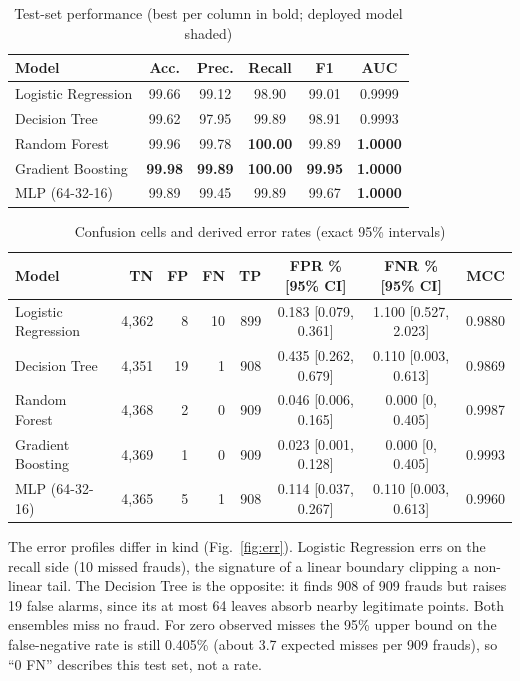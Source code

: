 \documentclass[conference]{IEEEtran}
\newcommand{\tabfont}{\footnotesize}
\begin{document}
\begin{table}[!t]
\caption{Test-set performance (best per column in bold; deployed model shaded)}\label{tab:bench}
\centering\tabfont
\setlength{\tabcolsep}{3.5pt}
\begin{tabular}{@{}lccccc@{}}
\toprule
\textbf{Model} & \textbf{Acc.} & \textbf{Prec.} & \textbf{Recall} & \textbf{F1} & \textbf{AUC}\\
\midrule
Logistic Regression & 99.66 & 99.12 & 98.90 & 99.01 & 0.9999\\
Decision Tree & 99.62 & 97.95 & 99.89 & 98.91 & 0.9993\\
\rowcolor{navy!8}Random Forest & 99.96 & 99.78 & \textbf{100.00} & 99.89 & \textbf{1.0000}\\
Gradient Boosting & \textbf{99.98} & \textbf{99.89} & \textbf{100.00} & \textbf{99.95} & \textbf{1.0000}\\
MLP (64-32-16) & 99.89 & 99.45 & 99.89 & 99.67 & \textbf{1.0000}\\
\bottomrule
\end{tabular}
\par{}
\end{table}

\begin{table}[!t]
\caption{Confusion cells and derived error rates (exact 95\% intervals)}\label{tab:cm}
\centering\tabfont
\begin{tabular}{@{}lrrrrccc@{}}
\toprule
\textbf{Model} & \textbf{TN} & \textbf{FP} & \textbf{FN} & \textbf{TP} & \textbf{FPR \% [95\% CI]} & \textbf{FNR \% [95\% CI]} & \textbf{MCC}\\
\midrule
Logistic Regression & 4,362 & 8 & 10 & 899 & 0.183 [0.079, 0.361] & 1.100 [0.527, 2.023] & 0.9880\\
Decision Tree & 4,351 & 19 & 1 & 908 & 0.435 [0.262, 0.679] & 0.110 [0.003, 0.613] & 0.9869\\
\rowcolor{navy!8}Random Forest & 4,368 & 2 & 0 & 909 & 0.046 [0.006, 0.165] & 0.000 [0, 0.405] & 0.9987\\
Gradient Boosting & 4,369 & 1 & 0 & 909 & 0.023 [0.001, 0.128] & 0.000 [0, 0.405] & 0.9993\\
MLP (64-32-16) & 4,365 & 5 & 1 & 908 & 0.114 [0.037, 0.267] & 0.110 [0.003, 0.613] & 0.9960\\
\bottomrule
\end{tabular}
\end{table}

The error profiles differ in kind (Fig.~\ref{fig:err}). Logistic Regression errs on the recall side (10 missed frauds), the signature of a linear boundary clipping a non-linear tail. The Decision Tree is the opposite: it finds 908 of 909 frauds but raises 19 false alarms, since its at most 64 leaves absorb nearby legitimate points. Both ensembles miss no fraud. For zero observed misses the 95\% upper bound on the false-negative rate is still 0.405\% (about 3.7 expected misses per 909 frauds), so ``0 FN'' describes this test set, not a rate.
\end{document}
